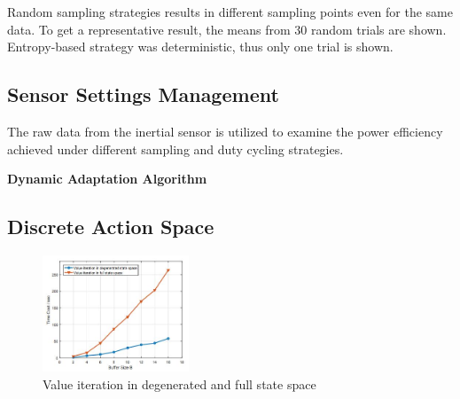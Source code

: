 \documentclass[letterpaper, 10pt, conference]{IEEEtran} %
\begin{document}


Random sampling strategies results in
different sampling points even for the same data. To get a representative result, the means from 30 random trials are shown. Entropy-based strategy was deterministic, thus only one trial is shown.

\subsection{ Sensor Settings Management}
The raw data from the inertial sensor is utilized to examine the power efficiency achieved under different sampling and duty cycling strategies. 

\begin{algorithm}[h]\label{algorithm}


    {\caption{\bf Dynamic Adaptation Algorithm} \label{Algorithm1}
    }
\end{algorithm}




\subsection{Discrete Action Space}

 \begin{figure}
    \centering
    \includegraphics[width=0.39\textwidth]{images/Valueiteration.jpg}
\caption{ Value iteration in degenerated and full state space}
    \label{fig:action}
  \end{figure}
 
\end{document}
